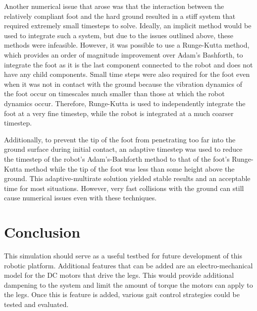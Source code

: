 \documentclass[letterpaper]{article}
\begin{document}
Another numerical issue that arose was that the interaction between the relatively compliant foot and the hard ground resulted in a stiff system that required extremely small timesteps to solve. Ideally, an implicit method would be used to integrate such a system, but due to the issues outlined above, these methods were infeasible. However, it was possible to use a Runge-Kutta method, which provides an order of magnitude improvement over Adam's Bashforth, to integrate the foot as it is the last component connected to the robot and does not have any child components. Small time steps were also required for the foot even when it was not in contact with the ground because the vibration dynamics of the foot occur on timescales much smaller than those at which the robot dynamics occur. Therefore, Runge-Kutta is used to independently integrate the foot at a very fine timestep, while the robot is integrated at a much coarser timestep. 

Additionally, to prevent the tip of the foot from penetrating too far into the ground surface during initial contact, an adaptive timestep was used to reduce the timestep of the robot's Adam's-Bashforth method to that of the foot's Runge-Kutta method while the tip of the foot was less than some height above the ground. This adaptive-multirate solution yielded stable results and an acceptable time for most situations. However, very fast collisions with the ground can still cause numerical issues even with these techniques.

\section{Conclusion}

This simulation should serve as a useful testbed for future development of this robotic platform. Additional features that can be added are an electro-mechanical model for the DC motors that drive the legs. This would provide additional dampening to the system and limit the amount of torque the motors can apply to the legs. Once this is feature is added, various gait control strategies could be tested and evaluated.

{}

\end{document}
